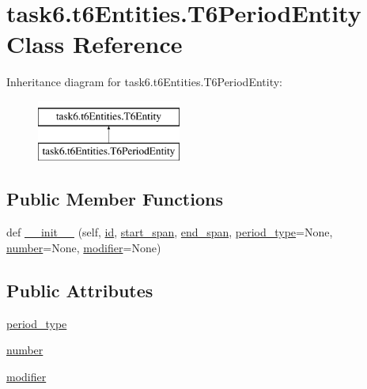 \hypertarget{classtask6_1_1t6Entities_1_1T6PeriodEntity}{}\section{task6.\+t6\+Entities.\+T6\+Period\+Entity Class Reference}
\label{classtask6_1_1t6Entities_1_1T6PeriodEntity}
Inheritance diagram for task6.\+t6\+Entities.\+T6\+Period\+Entity\+:\begin{figure}[H]
\begin{center}
\leavevmode
\includegraphics[height=2.000000cm]{classtask6_1_1t6Entities_1_1T6PeriodEntity}
\end{center}
\end{figure}
\subsection*{Public Member Functions}
\begin{DoxyCompactItemize}
\item 
def \hyperlink{classtask6_1_1t6Entities_1_1T6PeriodEntity_a2641256b4427ad07e9041d9f389a551d}{\+\_\+\+\_\+init\+\_\+\+\_\+} (self, \hyperlink{classtask6_1_1t6Entities_1_1T6Entity_afeeced8134bb3ebe0cfecc64d0ab46a4}{id}, \hyperlink{classtask6_1_1t6Entities_1_1T6Entity_a52779e9af8864dc98e8b02fc5b9b041a}{start\+\_\+span}, \hyperlink{classtask6_1_1t6Entities_1_1T6Entity_aeb402200b156cd9562c5111dfe777b98}{end\+\_\+span}, \hyperlink{classtask6_1_1t6Entities_1_1T6PeriodEntity_aa40d8fd07038f68f3f918a09fb0d1beb}{period\+\_\+type}=None, \hyperlink{classtask6_1_1t6Entities_1_1T6PeriodEntity_ae1a98d39cfb27a8dd99f3b54f35b4b14}{number}=None, \hyperlink{classtask6_1_1t6Entities_1_1T6PeriodEntity_a6ac8572830e19053387210cda80a8970}{modifier}=None)
\end{DoxyCompactItemize}
\subsection*{Public Attributes}
\begin{DoxyCompactItemize}
\item 
\hyperlink{classtask6_1_1t6Entities_1_1T6PeriodEntity_aa40d8fd07038f68f3f918a09fb0d1beb}{period\+\_\+type}
\item 
\hyperlink{classtask6_1_1t6Entities_1_1T6PeriodEntity_ae1a98d39cfb27a8dd99f3b54f35b4b14}{number}
\item 
\hyperlink{classtask6_1_1t6Entities_1_1T6PeriodEntity_a6ac8572830e19053387210cda80a8970}{modifier}
\end{DoxyCompactItemize}


